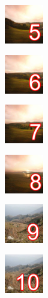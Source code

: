 \documentclass[11pt, a4paper]{article}
\begin{document}
\begin{task}
\begin{gridlayout}{\textwidth}{12cm}
\begin{row}{0.33}
            \begin{cell}{0.25}
                \centering
                \includegraphics[width=0.9\cellwidth]{img/thumbnail-5.png}
            \end{cell}
            \begin{cell}{0.25}
                \centering
                \includegraphics[width=0.9\cellwidth]{img/thumbnail-6.png}
            \end{cell}
            \begin{cell}{0.25}
                \centering
                \includegraphics[width=0.9\cellwidth]{img/thumbnail-7.png}
            \end{cell}
            \begin{cell}{0.25}
                \centering
                \includegraphics[width=0.9\cellwidth]{img/thumbnail-8.png}
            \end{cell}
        \end{row}
        \begin{row}{0.34}
            \begin{cell}{0.25}
                \centering
                \includegraphics[width=0.9\cellwidth]{img/thumbnail-9.png}
            \end{cell}
            \begin{cell}{0.25}
                \centering
                \includegraphics[width=0.9\cellwidth]{img/thumbnail-10.png}

\end{cell}
\end{row}
\end{gridlayout}
\end{task}
\end{document}

